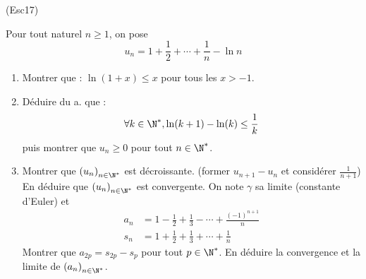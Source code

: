 \begin{tiny}(Esc17)\end{tiny} Pour tout naturel $n\geq 1$, on pose
\begin{displaymath}
 u_n = 1+\frac{1}{2}+\cdots+\frac{1}{n} -\ln n
\end{displaymath}
 \begin{enumerate}
  \item Montrer que : $\ln(1+x)\leq x$ pour tous les $x>-1$.
  \item Déduire du a. que :
\begin{displaymath}
 \forall k\in \N^*, \ln(k+1) - \ln(k) \leq \frac{1}{k}
\end{displaymath}
puis montrer que $u_n\geq 0$ pour tout $n\in \N^*$.
\item Montrer que $\left( u_n\right) _{n\in \N^*}$ est décroissante.\newline
 (former $u_{n+1}-u_n$ et considérer $\frac{1}{n+1}$)\newline
En déduire que $\left( u_n\right) _{n\in \N^*}$ est convergente. On note $\gamma$ sa limite (constante d'Euler) et
\begin{align*}
 a_n &= 1 -\frac{1}{2}+\frac{1}{3}- \cdots + \frac{(-1)^{n+1}}{n} \\
 s_n &= 1 +\frac{1}{2}+\frac{1}{3}+ \cdots + \frac{1}{n}
\end{align*}
Montrer que $a_{2p}=s_{2p}-s_p$ pour tout $p\in \N^*$. En déduire la convergence et la limite de $\left( a_n\right) _{n\in \N^*}$.
 \end{enumerate}
